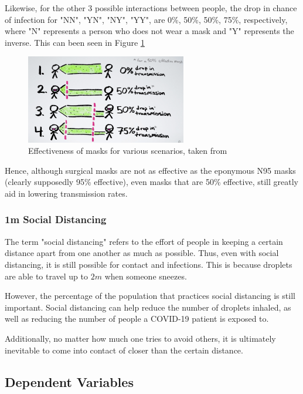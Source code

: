 \documentclass[a4paper,titlepage]{article}
\begin{document}
Likewise, for the other 3 possible interactions between people, the drop in chance of infection for "NN", "YN", "NY", "YY", are 0\%, 50\%, 50\%, 75\%, respectively, where "N" represents a person who does not wear a mask and "Y" represents the inverse. This can been seen in Figure \ref{fig:maskAllEffectiveness}

\begin{figure}[htbp]
    \centering
    \includegraphics[width=7cm]{maskAllEffectiveness.png}
    \caption{Effectiveness of masks for various scenarios, taken from \cite{maskvid_reich_2020}}
    \label{fig:maskAllEffectiveness}
\end{figure}

Hence, although surgical masks are not as effective as the eponymous N95 masks (clearly supposedly 95\% effective), even masks that are 50\% effective, still greatly aid in lowering transmission rates.

\subsubsection{1m Social Distancing}

The term "social distancing" refers to the effort of people in keeping a certain distance apart from one another as much as possible. Thus, even with social distancing, it is still possible for contact and infections. This is because droplets are able to travel up to $2\si{m}$ \cite{droplets_setti_passarini_de_gennaro_barbieri_perrone_borelli_palmisani_di_gilio_piscitelli_miani_et_al_2020} when someone sneezes.

However, the percentage of the population that practices social distancing is still important. Social distancing can help reduce the number of droplets inhaled, as well as reducing the number of people a COVID-19 patient is exposed to.

Additionally, no matter how much one tries to avoid others, it is ultimately inevitable to come into contact of closer than the certain distance.

\subsection{Dependent Variables}
\end{document}
